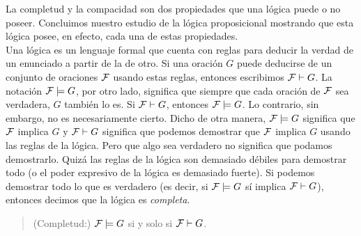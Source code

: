 \documentclass[12pt,a4paper]{book}
\begin{document}
    La completud y la compacidad son dos propiedades que una lógica puede o no poseer. Concluimos nuestro estudio de la
    lógica proposicional mostrando que esta lógica posee, en efecto, cada una de estas propiedades.\\
    Una lógica es un lenguaje formal que cuenta con reglas para deducir la verdad de un enunciado a partir de la de otro. Si
    una oración $G$ puede deducirse de un conjunto de oraciones $\mathcal{F}$ usando estas reglas, entonces escribimos
    $\mathcal{F}\vdash G$. La notación $\mathcal{F}\models G$, por otro lado, significa que siempre que cada oración de $\mathcal{F}$ sea
    verdadera, $G$ también lo es. Si $\mathcal{F}\vdash G$, entonces $\mathcal{F}\models G$. Lo contrario, sin embargo, no es
    necesariamente cierto. Dicho de otra manera, $\mathcal{F}\models G$ significa que $\mathcal{F}$ implica $G$ y $\mathcal{F}\vdash G$ significa que
    podemos demostrar que $\mathcal{F}$ implica $G$ usando las reglas de la lógica. Pero que algo sea verdadero no significa que
    podamos demostrarlo. Quizá las reglas de la lógica son demasiado débiles para demostrar todo (o el poder expresivo de la
    lógica es demasiado fuerte). Si podemos demostrar todo lo que es verdadero (es decir, si $\mathcal{F}\models G$ sí implica
    $\mathcal{F}\vdash G$), entonces decimos que la lógica es \textit{completa}.

    \begin{quote}
        (Completud:) $\mathcal{F}\models G$ si y solo si $\mathcal{F}\vdash G$.
    \end{quote}
\end{document}
